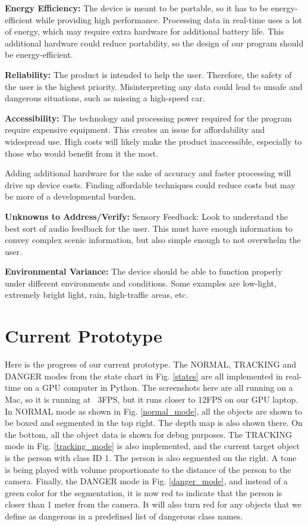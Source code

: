 \documentclass[12pt,a4paper]{article}
\begin{document}
\textbf{Energy Efficiency:}
The device is meant to be portable, so it has to be energy-efficient while providing high performance. Processing data in real-time uses a lot of energy, which may require extra hardware for additional battery life. This additional hardware could reduce portability, so the design of our program should be energy-efficient.

\textbf{Reliability:}
The product is intended to help the user. Therefore, the safety of the user is the highest priority. Misinterpreting any data could lead to unsafe and dangerous situations, such as missing a high-speed car.

\textbf{Accessibility:}
The technology and processing power required for the program require expensive equipment. This creates an issue for affordability and widespread use. High costs will likely make the product inaccessible, especially to those who would benefit from it the most. 

Adding additional hardware for the sake of accuracy and faster processing will drive up device costs. Finding affordable techniques could reduce costs but may be more of a developmental burden.

\textbf{Unknowns to Address/Verify:}
Sensory Feedback: Look to understand the best sort of audio feedback for the user. This must have enough information to convey complex scenic information, but also simple enough to not overwhelm the user. 

\textbf{Environmental Variance:}
The device should be able to function properly under different environments and conditions. Some examples are low-light, extremely bright light, rain, high-traffic areas, etc. 

\newpage
\section{Current Prototype}
Here is the progress of our current prototype. The NORMAL, TRACKING and DANGER modes from the state chart in Fig. \ref{states} are all implemented in real-time on a GPU computer in Python.
The screenshots here are all running on a Mac, so it is running at ~3FPS, but it runs closer to 12FPS on our GPU laptop.
In NORMAL mode as shown in Fig. \ref{normal_mode}, all the objects are shown to be boxed and segmented in the top right. The depth map is also shown there. On the bottom, all the object data is shown for debug purposes.
The TRACKING mode in Fig. \ref{tracking_mode} is also implemented, and the current target object is the person with class ID 1. The person is also segmented on the right. A tone is being played with volume proportionate to the distance of the person to the camera.
Finally, the DANGER mode in Fig. \ref{danger_mode}, and instead of a green color for the segmentation, it is now red to indicate that the person is closer than 1 meter from the camera. It will also turn red for any objects that we define as dangerous in a predefined list of dangerous class names.
\end{document}

